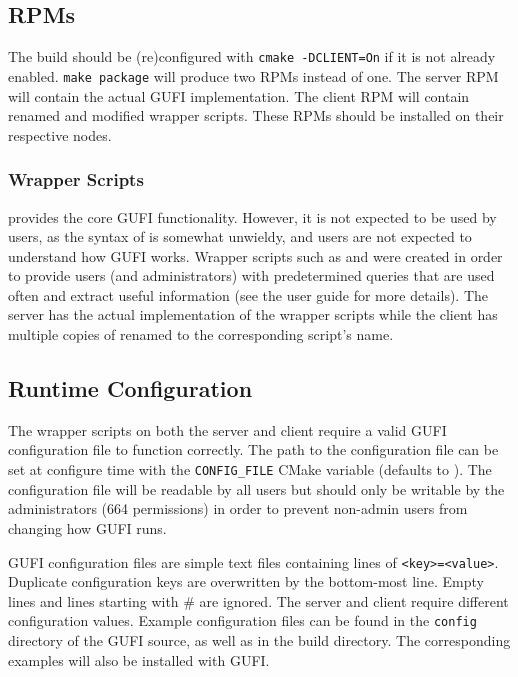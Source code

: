 \subsection{RPMs}
The build should be (re)configured with \texttt{cmake -DCLIENT=On} if
it is not already enabled. \texttt{make~package} will produce two RPMs
instead of one. The server RPM will contain the actual GUFI
implementation. The client RPM will contain renamed and modified
\guficlient wrapper scripts. These RPMs should be installed on their
respective nodes.

\subsubsection{Wrapper Scripts}
\gufiquery provides the core GUFI functionality. However, it is not
expected to be used by users, as the syntax of \gufiquery is somewhat
unwieldy, and users are not expected to understand how GUFI
works. Wrapper scripts such as \gufifind and \gufils were created in
order to provide users (and administrators) with predetermined queries
that are used often and extract useful information (see the user guide
for more details). The server has the actual implementation of the
wrapper scripts while the client has multiple copies of \guficlient
renamed to the corresponding script's name.

\subsection{Runtime Configuration}
The wrapper scripts on both the server and client require a valid GUFI
configuration file to function correctly. The path to the
configuration file can be set at configure time with the
\texttt{CONFIG\_FILE} CMake variable (defaults to
\guficonfigfile). The configuration file will be readable by all users
but should only be writable by the administrators (664 permissions) in
order to prevent non-admin users from changing how GUFI runs.

GUFI configuration files are simple text files containing lines of
\texttt{<key>=<value>}. Duplicate configuration keys are overwritten
by the bottom-most line. Empty lines and lines starting with \# are
ignored. The server and client require different configuration
values. Example configuration files can be found in the
\texttt{config} directory of the GUFI source, as well as in the build
directory. The corresponding examples will also be installed with
GUFI.


